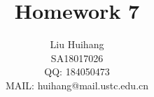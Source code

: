 
\title{
    Homework 7
}

\author{\name Liu Huihang  \\
        \addr SA18017026  \\
        QQ: 184050473 \\
        MAIL: huihang@mail.ustc.edu.cn
}


\maketitle